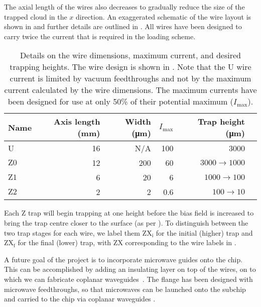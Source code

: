 The axial length of the wires also decreases to gradually reduce the size of
the trapped cloud in the $x$ direction. An exaggerated schematic of the wire
layout is shown in  and further details are
outlined in . All wires have been designed to
carry twice the current that is required in the loading scheme.

\begin{table}
  \centering
\begin{tabular}{lrrrrr}
  Name & Axis length (\si{\milli\meter}) & Width (\si{\micro\meter})& $I_\text{max}$ & Trap height (\si{\micro\meter}) \\
 \hline
  U & 16 & N/A& 100 & 3000\\
  $\mathrm{Z0}$ & 12 & 200& 60& $3000\rightarrow1000$ \\
  $\mathrm{Z1}$ &  6 & 20& 6& $1000\rightarrow100$ \\
  $\mathrm{Z2}$ &  2 & 2& 0.6& $100\rightarrow10$ \\
 \hline
\end{tabular}
  \caption{Details on the wire dimensions, maximum current, and desired
  trapping heights. The wire design is shown in
  . Note that the U wire current is
  limited by vacuum feedthroughs and not by the maximum current calculated by
  the wire dimensions.  The maximum currents have been designed for use at only
  50\% of their potential maximum ($I_\text{max}$).
  }
  \label{design:table:wires}
\end{table}

Each Z trap will begin trapping at one height before the bias field is
increased to bring the trap centre closer to the surface (as per
).  To distinguish between the two trap stages for
each wire, we label them $\mathrm{ZX_i}$ for the initial (higher) trap and
$\mathrm{ZX_f}$ for the final (lower) trap, with $\mathrm{ZX}$ corresponding to
the wire labels in .

A future goal of the project is to incorporate microwave guides onto the chip. This can be
accomplished by adding an insulating layer on top of the wires, on to which we
can fabricate coplanar waveguides~\cite{1127105}. The flange has been designed
with microwave feedthroughs, so that microwaves can be launched onto the
subchip and carried to the chip via coplanar waveguides .

